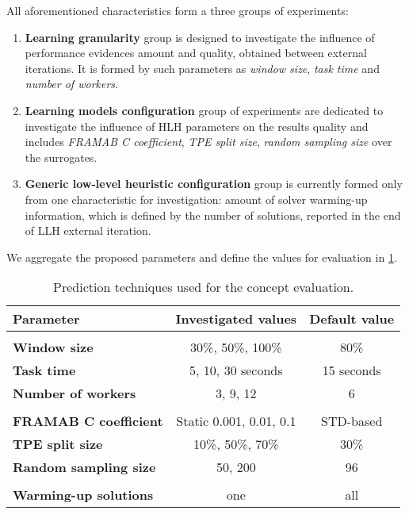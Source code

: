 All aforementioned characteristics form a three groups of experiments:
\begin{enumerate}
	\item \textbf{Learning granularity} group is designed to investigate the influence of performance evidences amount and quality, obtained between external iterations. It is formed by such parameters as \emph{window size}, \emph{task time} and \emph{number of workers}.
	
	\item \textbf{Learning models configuration} group of experiments are dedicated to investigate the influence of HLH parameters on the results quality and includes \emph{FRAMAB C coefficient}, \emph{TPE split size}, \emph{random sampling size} over the surrogates.
	
	\item \textbf{Generic low-level heuristic configuration} group is currently formed only from one characteristic for investigation: amount of solver warming-up information, which is defined by the number of solutions, reported in the end of LLH external iteration.
\end{enumerate}

We aggregate the proposed parameters and define the values for evaluation in \cref{eval:2: planning table}.

\begin{table}[h!]
	\centering
	\begin{tabular}{l||c|c}
		\textbf{Parameter} & \textbf{Investigated values} & \textbf{Default value} \\
		\hline
		\hline
		\rowcolor{gray!10}
		\multicolumn{3}{c}{Learning granularity} \\
		\textbf{Window size} & 30\%, 50\%, 100\% & 80\% \\
		\textbf{Task time} & 5, 10, 30 seconds & 15 seconds \\
		\textbf{Number of workers} & 3, 9, 12 & 6 \\
		\rowcolor{gray!10}
		\multicolumn{3}{c}{Learning models configuration} \\
		\textbf{FRAMAB C coefficient} & Static 0.001, 0.01, 0.1 & STD-based \\
		\textbf{TPE split size} & 10\%, 50\%, 70\% & 30\% \\
		\textbf{Random sampling size} & 50, 200 & 96 \\
		\rowcolor{gray!10}
		\multicolumn{3}{c}{Generic LLH configuration} \\
		\textbf{Warming-up solutions} & one & all
	\end{tabular}
	\caption{Prediction techniques used for the concept evaluation.}
	\label{eval:2: planning table}
\end{table}

